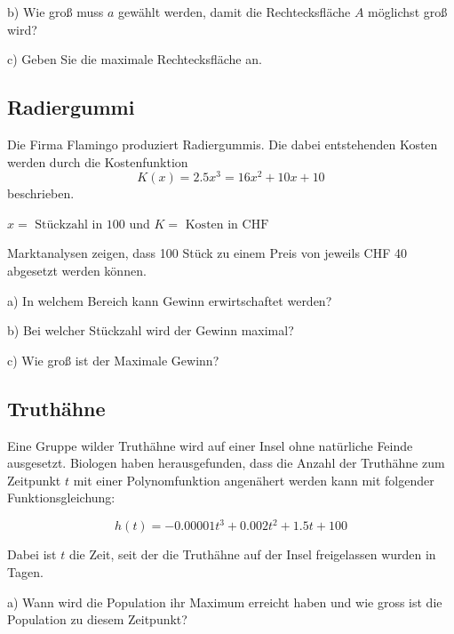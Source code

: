 b) Wie groß muss $a$ gewählt werden, damit die Rechtecksfläche $A$
möglichst groß wird?

c) Geben Sie die maximale Rechtecksfläche an.

\subsection{Radiergummi}
Die Firma Flamingo produziert Radiergummis. Die dabei entstehenden
Kosten werden durch die Kostenfunktion
$$K(x) = 2.5x^3 = 16x^2 + 10x + 10$$
beschrieben.

$x = \text{ Stückzahl in 100}$ und $K = \text{ Kosten in CHF}$

Marktanalysen zeigen, dass 100 Stück zu einem Preis von jeweils CHF 40
abgesetzt werden können.

a) In welchem Bereich kann Gewinn erwirtschaftet werden?

b) Bei welcher Stückzahl wird der Gewinn maximal?

c) Wie groß ist der Maximale Gewinn?



\subsection{Truthähne}
Eine Gruppe wilder Truthähne wird auf einer Insel ohne natürliche Feinde ausgesetzt. Biologen haben
herausgefunden, dass die Anzahl der Truthähne zum Zeitpunkt $t$ mit
einer Polynomfunktion angenähert werden kann mit folgender
Funktionsgleichung:

$$h(t) = -0.00001 t^3 + 0.002 t^2 + 1.5t + 100$$

Dabei ist $t$ die Zeit, seit der die Truthähne auf der Insel freigelassen wurden in Tagen.

a)
Wann wird die Population ihr Maximum erreicht haben und wie gross ist die Population zu
diesem Zeitpunkt?


